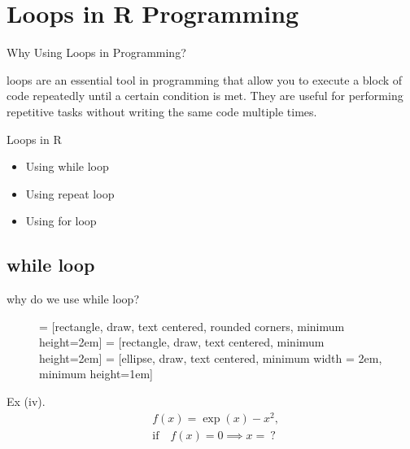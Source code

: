 \documentclass{beamer}\usepackage[]{graphicx}\usepackage[]{xcolor}
\begin{document}
\section{Loops in R Programming}
\begin{frame}{Why Using Loops in Programming?}

\begin{alertblock}
{\large loops are an essential tool in programming that allow you to execute a block of code repeatedly until a certain condition is met. They are useful for performing repetitive 
tasks without writing the same code multiple times.}
\end{alertblock}
\end{frame}




\begin{frame}{Loops in R}
\begin{itemize}
    \item Using while loop
    \item Using repeat loop
    \item Using for loop
\end{itemize}
\end{frame}
\subsection{while loop}
\begin{frame}{why do we use while loop?}
    \begin{figure}[H]
        \centering
     = [rectangle, draw, text centered, rounded corners, minimum height=2em]
     = [rectangle, draw, text centered, minimum height=2em]
     = [ellipse, draw, text centered, minimum width = 2em, minimum height=1em]
\end{figure}
\end{frame}
\begin{frame}
    
    \begin{exampleblock}{Ex (iv).}
        \label{ex1}
\begin{align*}
    & f(x) = \exp(x) - x^2, \\
    & \text{if} \quad f(x) = 0 \implies x = ~?
\end{align*}
        
    \end{exampleblock}
\end{frame}
\end{document}
